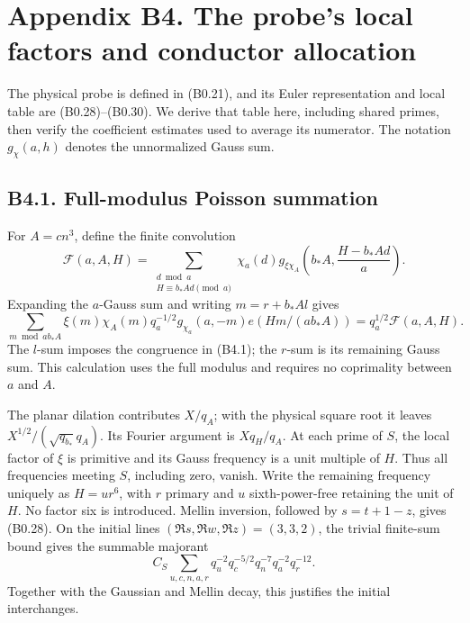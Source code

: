 \documentclass[11pt,a4paper]{article}
\begin{document}
\hypertarget{appendix-b4.-the-probes-local-factors-and-conductor-allocation}{%
\section{Appendix B4. The probe's local factors and conductor
allocation}\label{appendix-b4.-the-probes-local-factors-and-conductor-allocation}}

The physical probe is defined in (B0.21), and its Euler representation
and local table are (B0.28)--(B0.30). We derive that table here,
including shared primes, then verify the coefficient estimates used to
average its numerator. The notation \(g_\chi(a,\allowbreak{}h)\) denotes the
unnormalized Gauss sum.

\hypertarget{b4.1.-full-modulus-poisson-summation}{%
\subsection{B4.1. Full-modulus Poisson
summation}\label{b4.1.-full-modulus-poisson-summation}}

For \(A=cn^3\), define the finite convolution \[
\mathcal F(a,A,H)=\sum_{\substack{d\bmod a\\H\equiv b_*Ad\pmod a}}
\chi_a(d)g_{\xi\chi_A}\!\left(b_*A,\frac{H-b_*Ad}{a}\right).
\tag{B4.1}
\] Expanding the \(a\)-Gauss sum and writing \(m=r+b_*A l\) gives \[
\sum_{m\bmod ab_*A}\xi(m)\chi_A(m)q_a^{-1/2}g_{\chi_a}(a,-m)e(Hm/(ab_*A))
=q_a^{1/2}\mathcal F(a,A,H).
\tag{B4.2}
\] The \(l\)-sum imposes the congruence in (B4.1); the \(r\)-sum is its
remaining Gauss sum. This calculation uses the full modulus and requires
no coprimality between \(a\) and \(A\).

The planar dilation contributes \(X/q_A\); with the physical square root
it leaves \(X^{1/2}/(\sqrt{q_{b_*}}q_A)\). Its Fourier argument is
\(Xq_H/q_A\). At each prime of \(S\), the local factor of \(\xi\) is
primitive and its Gauss frequency is a unit multiple of \(H\). Thus all
frequencies meeting \(S\), including zero, vanish. Write the remaining
frequency uniquely as \(H=u r^6\), with \(r\) primary and \(u\)
sixth-power-free retaining the unit of \(H\). No factor six is
introduced. Mellin inversion, followed by \(s=t+1-z\), gives (B0.28). On
the initial lines \((\Re s,\allowbreak{}\Re w,\allowbreak{}\Re z)=(3,\allowbreak{}3,\allowbreak{}2)\), the trivial
finite-sum bound gives the summable majorant \[
C_S\sum_{u,c,n,a,r}q_u^{-2}q_c^{-5/2}q_n^{-7}q_a^{-2}q_r^{-12}.
\tag{B4.3}
\] Together with the Gaussian and Mellin decay, this justifies the
initial interchanges.
\end{document}
